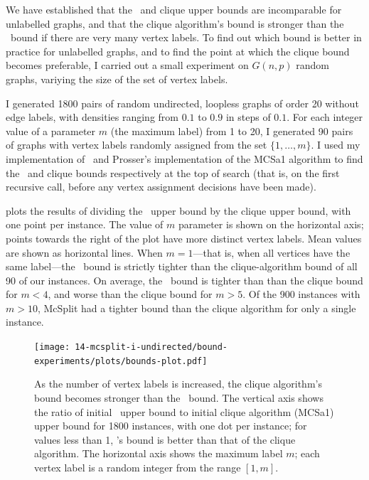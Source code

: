 We have established that the \McSplit\ and clique upper bounds are incomparable for unlabelled graphs,
and that the clique algorithm's bound is stronger than the \McSplit\ bound if there are very many vertex
labels.  To find out which bound is better in practice for unlabelled graphs, and to find the point
at which the clique bound becomes preferable, I carried out a small experiment on $G(n,p)$ random graphs,
variying the size of the set of vertex labels.

I generated 1800 pairs of random undirected, loopless graphs of order 20 without edge labels,
with densities ranging from $0.1$ to $0.9$
in steps of $0.1$.  For each integer value of a parameter $m$ (the maximum label) from 1 to 20, I generated
90 pairs of graphs with vertex labels randomly assigned from the set $\{1,\dots,m\}$.  I used my
implementation of \McSplit\ and Prosser's implementation of the MCSa1 algorithm
\cite{DBLP:journals/algorithms/Prosser12} to find the \McSplit\ and clique bounds respectively
at the top of search (that is, on the first recursive call, before any vertex assignment decisions
have been made).

 plots the results of dividing the \McSplit\ upper bound by the
clique upper bound, with one point per instance.  The value of $m$ parameter is shown on the horizontal
axis; points towards the right of the plot have more distinct vertex labels.  Mean values
are shown as horizontal lines.  When $m=1$---that is,
when all vertices have the same label---the \McSplit\ bound is strictly tighter than the clique-algorithm
bound of all 90 of our instances.  On average, the \McSplit\ bound is tighter than than the clique
bound for $m < 4$, and worse than the clique bound for $m > 5$.  Of the 900 instances with $m > 10$,
McSplit had a tighter bound than the clique algorithm for only a single instance.

\begin{figure}[htb]
    \centering
    \texttt{[image: 14-mcsplit-i-undirected/bound-experiments/plots/bounds-plot.pdf]}
    \caption{As the number of vertex labels is increased, the clique algorithm's bound
    	becomes stronger than the \McSplit\ bound.
        The vertical axis shows the ratio of initial \McSplit\ upper bound
	to initial clique algorithm (MCSa1) upper bound for 1800 instances, with one dot per instance;
	for values less than 1, \McSplit's bound is better than that of the clique algorithm.
	The horizontal axis shows the maximum label $m$; each vertex label is a random integer 
	from the range $[1,m]$.}
    \label{figure:bound-ratio}
\end{figure}

